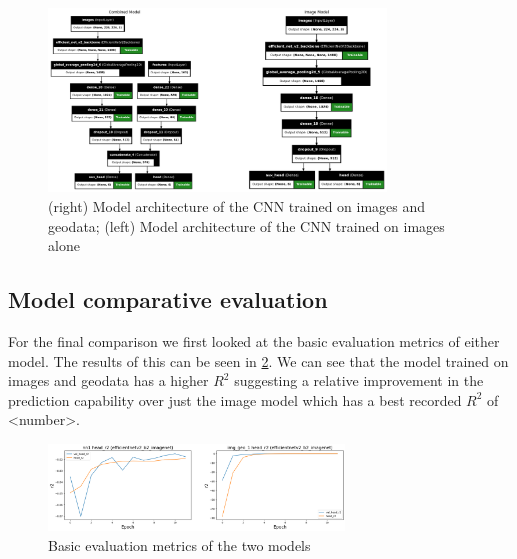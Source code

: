 \documentclass[12pt,a4paper,oneside]{article}
\begin{document}
\begin{figure}[!h]
    \centering 
    \includegraphics[width=0.8\textwidth]{assets/img_geo_model.png}
    \caption{(right) Model architecture of the CNN trained on images and geodata; (left) Model architecture of the CNN trained on images alone}
    \label{fig:geodata_model}
\end{figure}


\subsection{Model comparative evaluation}


For the final comparison we first looked at the basic evaluation metrics of either model. The results of this can be seen in \ref{fig:basic_evaluation}. We can see that the model trained on images and geodata has a higher $R^2$ suggesting a relative improvement in the prediction capability over just the image model which has a best recorded $R^2$ of <number>. 

\begin{figure}[!h]
    \centering
    \includegraphics[width=0.7\textwidth]{assets/fin_img_vs_geo.png}
    \caption{Basic evaluation metrics of the two models}
    \label{fig:basic_evaluation}
\end{figure}

\smallskip

\end{document}
